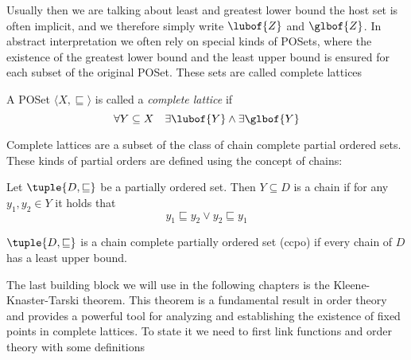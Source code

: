 Usually then we are talking about least and greatest lower bound the
host set is often implicit, and we therefore simply write
\(\lubof{Z}\) and \(\glbof{Z}\).  In abstract interpretation we often
rely on special kinds of POSets, where the existence of the greatest
lower bound and the least upper bound is ensured for each subset of
the original POSet. These sets are called complete lattices

\begin{definition}
  A POSet \(\langle X, \sqsubseteq\rangle\) is called a \emph{complete
  lattice} if \[\forall Y \subseteq X \quad \exists \lubof{Y} \wedge
  \exists \glbof{Y}\]
\end{definition}

Complete lattices are a subset of the class of chain complete partial
ordered sets. These kinds of partial orders are defined using the
concept of chains:

\begin{definition}[Chain]
  Let \(\tuple{D, \sqsubseteq}\) be a partially ordered set. Then
  \(Y\subseteq D\) is a chain if for any \(y_1, y_2 \in Y\) it holds
  that
  \begin{equation*}
    y_1 \sqsubseteq y_2 \vee y_2 \sqsubseteq y_1
  \end{equation*}
\end{definition}

\begin{definition}
  \(\tuple{D, \sqsubseteq}\) is a chain complete partially ordered set
  (ccpo) if every chain of \(D\) has a least upper bound.
\end{definition}



The last building block we will use in the following chapters is the
Kleene-Knaster-Tarski theorem. This theorem is a fundamental result in
order theory and provides a powerful tool for analyzing and
establishing the existence of fixed points in complete lattices. To
state it we need to first link functions and order theory with some
definitions

